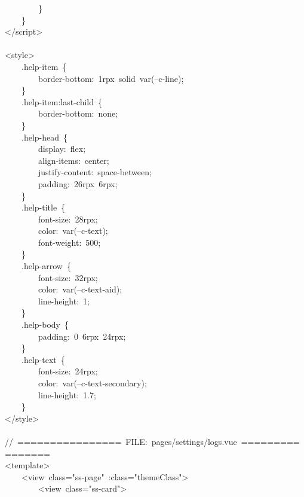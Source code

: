 \documentclass[a4paper,10pt]{article}
\begin{document}
{\ttfamily\footnotesize\raggedright
~~~~~~~~\}\\
~~~~\}\\
</script>\\
\mbox{}\\
<style>\\
~~~~.help-item~\{\\
~~~~~~~~border-bottom:~1rpx~solid~var(--c-line);\\
~~~~\}\\
~~~~.help-item:last-child~\{\\
~~~~~~~~border-bottom:~none;\\
~~~~\}\\
~~~~.help-head~\{\\
~~~~~~~~display:~flex;\\
~~~~~~~~align-items:~center;\\
~~~~~~~~justify-content:~space-between;\\
~~~~~~~~padding:~26rpx~6rpx;\\
~~~~\}\\
~~~~.help-title~\{\\
~~~~~~~~font-size:~28rpx;\\
~~~~~~~~color:~var(--c-text);\\
~~~~~~~~font-weight:~500;\\
~~~~\}\\
~~~~.help-arrow~\{\\
~~~~~~~~font-size:~32rpx;\\
~~~~~~~~color:~var(--c-text-aid);\\
~~~~~~~~line-height:~1;\\
~~~~\}\\
~~~~.help-body~\{\\
~~~~~~~~padding:~0~6rpx~24rpx;\\
~~~~\}\\
~~~~.help-text~\{\\
~~~~~~~~font-size:~24rpx;\\
~~~~~~~~color:~var(--c-text-secondary);\\
~~~~~~~~line-height:~1.7;\\
~~~~\}\\
</style>\\
\mbox{}\\
//~================~FILE:~pages/settings/logs.vue~================\\
<template>\\
~~~~<view~class="ss-page"~:class="themeClass">\\
~~~~~~~~<view~class="ss-card">\\
}
\end{document}
